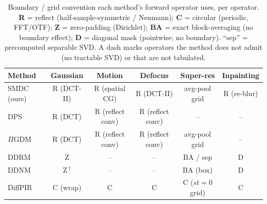 \documentclass[11pt]{article}
\begin{document}
\begin{table}[h]
\centering
\caption{Boundary / grid convention each method's forward operator uses, per operator.
\textbf{R} = reflect (half-sample-symmetric / Neumann); \textbf{C} = circular (periodic, FFT/OTF);
\textbf{Z} = zero-padding (Dirichlet); \textbf{BA} = exact block-averaging (no boundary effect);
\textbf{D} = diagonal mask (pointwise; no boundary). ``sep'' = precomputed separable SVD.
A dash marks operators the method does not admit (no tractable SVD) or that are not tabulated.}
\label{tab:boundary}
\begin{tabular}{lccccc}
\toprule
Method & Gaussian & Motion & Defocus & Super-res & Inpainting \\
\midrule
SMDC (ours)   & R (DCT-II) & R (spatial CG)   & R (DCT-II)       & avg-pool grid & R (re-blur) \\
DPS           & R (DCT)    & R (reflect conv) & R (reflect conv) & --            & -- \\
$\Pi$GDM      & R (DCT)    & R (reflect conv) & R (reflect conv) & avg-pool grid & -- \\
DDRM          & Z          & --             & --         & BA / sep      & D \\
DDNM          & Z\,$^\dagger$ & --          & --         & BA (box)      & D \\
DiffPIR       & C (wrap)   & C              & C          & C ($st{=}0$ grid) & C \\
\bottomrule
\end{tabular}
\end{table}
\end{document}
